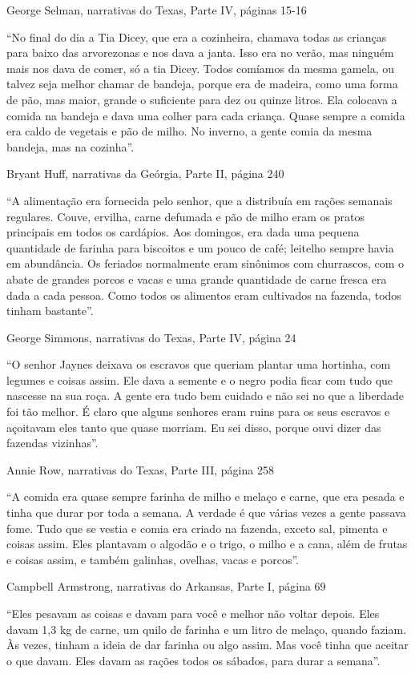 George Selman, narrativas do Texas, Parte IV, páginas 15-16

``No final do dia a Tia Dicey, que era a cozinheira, chamava todas as
crianças para baixo das arvorezonas e nos dava a janta. Isso era no
verão, mas ninguém mais nos dava de comer, só a tia Dicey. Todos
comíamos da mesma gamela, ou talvez seja melhor chamar de bandeja,
porque era de madeira, como uma forma de pão, mas maior, grande o
suficiente para dez ou quinze litros. Ela colocava a comida na bandeja e
dava uma colher para cada criança. Quase sempre a comida era caldo de
vegetais e pão de milho. No inverno, a gente comia da mesma bandeja, mas
na cozinha''.

Bryant Huff, narrativas da Geórgia, Parte II, página 240

``A alimentação era fornecida pelo senhor, que a distribuía em rações
semanais regulares. Couve, ervilha, carne defumada e pão de milho eram
os pratos principais em todos os cardápios. Aos domingos, era dada uma
pequena quantidade de farinha para biscoitos e um pouco de café;
leitelho sempre havia em abundância. Os feriados normalmente eram
sinônimos com churrascos, com o abate de grandes porcos e vacas e uma
grande quantidade de carne fresca era dada a cada pessoa. Como todos os
alimentos eram cultivados na fazenda, todos tinham bastante''.

George Simmons, narrativas do Texas, Parte IV, página 24

``O senhor Jaynes deixava os escravos que queriam plantar uma hortinha,
com legumes e coisas assim. Ele dava a semente e o negro podia ficar com
tudo que nascesse na sua roça. A gente era tudo bem cuidado e não sei no
que a liberdade foi tão melhor. É claro que alguns senhores eram ruins
para os seus escravos e açoitavam eles tanto que quase morriam. Eu sei
disso, porque ouvi dizer das fazendas vizinhas''.

Annie Row, narrativas do Texas, Parte III, página 258

``A comida era quase sempre farinha de milho e melaço e carne, que era
pesada e tinha que durar por toda a semana. A verdade é que várias vezes
a gente passava fome. Tudo que se vestia e comia era criado na fazenda,
exceto sal, pimenta e coisas assim. Eles plantavam o algodão e o trigo,
o milho e a cana, além de frutas e coisas assim, e também galinhas,
ovelhas, vacas e porcos''.

Campbell Armstrong, narrativas do Arkansas, Parte I, página 69

``Eles pesavam as coisas e davam para você e melhor não voltar depois.
Eles davam 1,3 kg de carne, um quilo de farinha e um litro de melaço,
quando faziam. Às vezes, tinham a ideia de dar farinha ou algo assim.
Mas você tinha que aceitar o que davam. Eles davam as rações todos os
sábados, para durar a semana''.


